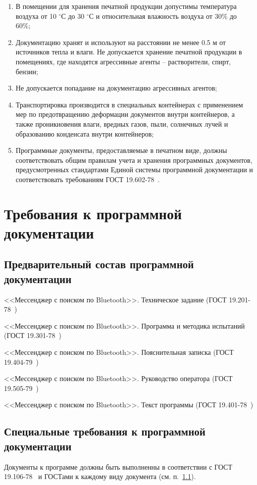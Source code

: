 \documentclass[techtask]{espd}
\begin{document}
\begin{enumerate}
\item В помещении для хранения печатной продукции допустимы температура воздуха от 10 $^\circ$С до 30 $^\circ$С и относительная влажность воздуха от 30\% до 60\%;
\item Документацию хранят и используют на расстоянии не менее 0.5 м от источников тепла и влаги. Не допускается хранение печатной продукции в помещениях, где находятся агрессивные агенты – растворители, спирт, бензин;
\item Не допускается попадание на документацию агрессивных агентов;
\item Транспортировка производится в специальных контейнерах с применением мер по предотвращению деформации документов внутри контейнеров, а также проникновения влаги, вредных газов, пыли, солнечных лучей и образованию конденсата внутри контейнеров;
\item Программные документы, предоставляемые в печатном виде, должны соответствовать общим правилам учета и хранения программных документов, предусмотренных стандартами Единой системы программной документации и соответствовать требованиям ГОСТ 19.602-78~\cite{espd602}.
\end{enumerate}

\section{Требования к программной документации}
\subsection{Предварительный состав программной документации}\label{subsection:documentation}
<<Мессенджер с поиском по Bluetooth>>. Техническое задание (ГОСТ 19.201-78~\cite{espd201})

<<Мессенджер с поиском по Bluetooth>>. Программа и методика испытаний (ГОСТ 19.301-78~\cite{espd301})

<<Мессенджер с поиском по Bluetooth>>. Пояснительная записка (ГОСТ 19.404-79~\cite{espd404})

<<Мессенджер с поиском по Bluetooth>>. Руководство оператора (ГОСТ 19.505-79~\cite{espd505})

<<Мессенджер с поиском по Bluetooth>>. Текст программы (ГОСТ 19.401-78~\cite{espd401})

\subsection{Специальные требования к программной документации}\label{subsection:docspec}
Документы к программе должны быть выполненны в соответствии с ГОСТ 19.106-78~\cite{espd106} и ГОСТами к каждому виду документа (см. п.~\ref{subsection:documentation}).
\end{document}

